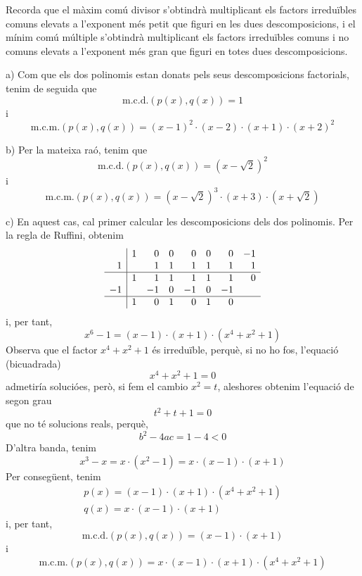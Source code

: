 \begin{solucio}
Recorda que el màxim comú divisor s'obtindrà multiplicant
els factors irreduïbles comuns elevats a l'exponent més petit
que figuri en les dues descomposicions, i el mínim comú múltiple s'obtindrà multiplicant els factors irreduïbles comuns i no
comuns elevats a l'exponent més gran que figuri en totes dues
descomposicions.

a) Com que els dos polinomis estan donats pels seus descomposicions
factorials, tenim de seguida que\[
\text{m.c.d.}\left( p(x),q(x)\right) =1
\]i\[
\text{m.c.m.}\left( p(x),q(x)\right) =(x-1)^{2}\cdot (x-2)\cdot (x+1)\cdot
(x+2)^{2}
\]

b) Per la mateixa raó, tenim que\[
\text{m.c.d.}\left( p(x),q(x)\right) =(x-\sqrt{2})^{2}
\]i\[
\text{m.c.m.}\left( p(x),q(x)\right) =(x-\sqrt{2})^{3}\cdot (x+3)\cdot (x+\sqrt{2})
\]

c) En aquest cas, cal primer calcular les descomposicions dels dos
polinomis. Per la regla de Ruffini, obtenim\[
\begin{array}{r|rrrrrrr}
& 1 & 0 & 0 & 0 & 0 & 0 & -1 \\
1 & & 1 & 1 & 1 & 1 & 1 & 1 \\\hline
& 1 & 1 & 1 & 1 & 1 & 1 & 0 \\
-1 & & -1 & 0 & -1 & 0 & -1 & \\\hline
 & 1 & 0 & 1 & 0 & 1 & 0 &
\end{array}\]i, per tant,
\[
x^{6}-1=(x-1)\cdot (x+1)\cdot (x^{4}+x^{2}+1)
\]Observa que el factor $x^{4}+x^{2}+1$ és irreduïble, perquè, si no ho fos,
l'equació (bicuadrada)\[
x^{4}+x^{2}+1=0
\]admetiría solucióes, però, si fem el cambio $x^{2}=t$, aleshores
obtenim l'equació de segon grau\[
t^{2}+t+1=0
\]que no té solucions reals, perquè,\[
b^{2}-4ac=1-4<0
\]D'altra banda, tenim\[
x^{3}-x=x\cdot (x^{2}-1)=x\cdot (x-1)\cdot (x+1)
\]Per consegüent, tenim\[
\begin{array}{l}
p(x)=(x-1)\cdot (x+1)\cdot (x^{4}+x^{2}+1) \\
q(x)=x\cdot (x-1)\cdot (x+1)\end{array}\]i, per tant,\[
\text{m.c.d.}\left( p(x),q(x)\right) =(x-1)\cdot (x+1)
\]i\[
\text{m.c.m.}\left( p(x),q(x)\right) =x\cdot (x-1)\cdot (x+1)\cdot
(x^{4}+x^{2}+1)
\]


\end{solucio}
